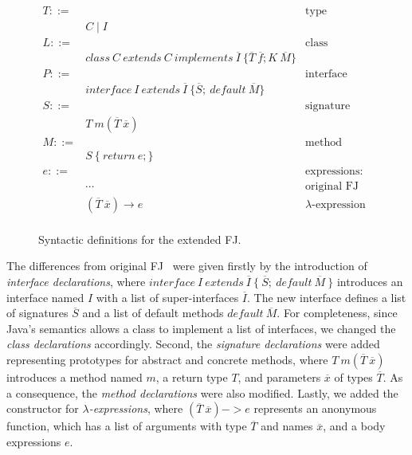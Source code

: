 \documentclass[tese,capa,english]{texufpel}
\begin{document}
\begin{figure}[!htb]
\[
\begin{array}{llr}
  T ::= & \ \ \ \ \ \ \ \ \ \ \ \ \ \ \ \ \ \ \ \ \ \ \ \ \ \ \ \ \ \ \ \ \ \ \ \ \ \ & \textrm{type definitions} \\
        & C \mid I & \\
  L ::= & & \textrm{class declarations} \\
        & class ~ C ~ extends ~ C ~ implements ~ \overline{I} ~ \{ \overline{T} ~ \overline{f}; K ~ \overline{M} \} & \\
  P ::= & & \textrm{interface declarations} \\
        & interface ~ I ~ extends ~ \overline{I} ~ \{ \overline{S}; ~ default ~ \overline{M} \} & \\
  S ::= & & \textrm{signature declarations} \\
        & T ~ m(\overline{T} ~ \overline{x}) & \\
  M ::= & & \textrm{method declarations} \\
        & S ~ \{ ~ return ~ e; \} & \\
  e ::= & & \textrm{expressions: } \\
        & \cdots & \textrm{original FJ constructors} \\
        & (\overline{T} ~ \overline{x}) \rightarrow e & \lambda\textrm{-expression} \\
\end{array}
\]
\caption{Syntactic definitions for the extended FJ.}
\label{fig:fje-syntax}
\end{figure}

The differences from original FJ~\cite{Igarashi:2001:FJM:503502.503505} were given firstly by the introduction of \emph{interface declarations}, where $interface ~ I ~ extends ~ \overline{I} ~ \{ ~ \overline{S}; ~ default ~ \overline{M} ~ \}$ introduces an interface named $I$ with a list of super-interfaces $\overline{I}$. The new interface defines a list of signatures $\overline{S}$ and a list of default methods $default ~ \overline{M}$. For completeness, since Java's semantics allows a class to implement a list of interfaces, we changed the \emph{class declarations} accordingly. Second, the \emph{signature declarations} were added representing prototypes for abstract and concrete methods, where $T ~ m(\overline{T} ~ \overline{x})$ introduces a method named $m$, a return type $T$, and parameters $\overline{x}$ of types $\overline{T}$. As a consequence, the \emph{method declarations} were also modified. Lastly, we added the constructor for \emph{$\lambda$-expressions}, where $(\overline{T} ~ \overline{x}) -> e$ represents an anonymous function, which has a list of arguments with type $\overline{T}$ and names $\overline{x}$, and a body expressions $e$. 
\end{document}
